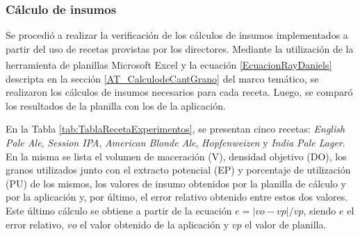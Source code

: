 
\subsubsection{Cálculo de insumos}

\par Se procedió a realizar la verificación de los cálculos de insumos implementados a partir del uso de recetas provistas por los directores. Mediante la utilización de la herramienta de planillas Microsoft \textsuperscript{\textregistered} Excel y la ecuación \ref{EcuacionRayDaniels} descripta en la sección \ref{AT_CalculodeCantGrano} del marco temático, se realizaron los cálculos de insumos necesarios para cada receta. Luego, se comparó los resultados de la planilla con los de la aplicación.

\par En la Tabla \ref{tab:TablaRecetaExperimentos}, se presentan cinco recetas: \textit{English Pale Ale}, \textit{Session IPA}, \textit{American Blonde Ale}, \textit{Hopfenweizen} y \textit{India Pale Lager}. 
En la misma se lista el volumen de maceración (V), densidad objetivo (DO), los granos utilizados junto con el extracto potencial (EP) y porcentaje de utilización (PU) de los mismos, los valores de insumo obtenidos por la planilla de cálculo y por la aplicación y, por último, el error relativo obtenido entre estos dos valores. Este último cálculo se obtiene a partir de la ecuación $ e = |vo-vp|/vp $, siendo $e$ el error relativo, $vo$ el valor obtenido de la aplicación y $vp$ el valor de planilla.

